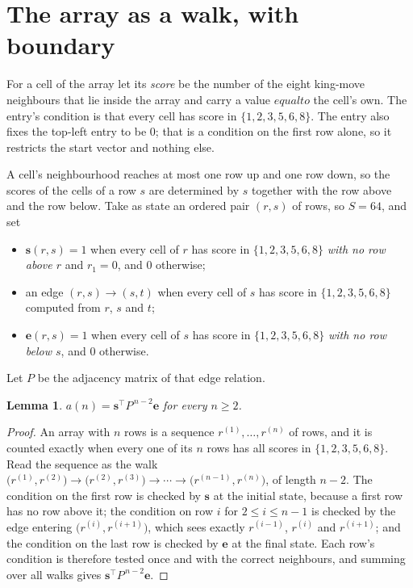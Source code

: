 \documentclass[11pt,a4paper]{article}
\theoremstyle{plain}
\newtheorem{lemma}[theorem]{Lemma}
\theoremstyle{definition}
\begin{document}
\section{The array as a walk, with boundary}

For a cell of the array let its \emph{score} be the number of the eight king-move neighbours that lie inside
the array and carry a value $equal to$ the cell's own. The entry's condition is that every cell
has score in $\{1,2,3,5,6,8\}$. The entry also fixes the top-left entry to be $0$; that is a condition on the first row alone, so it restricts the start vector and nothing else.

A cell's neighbourhood reaches at most one row up and one row down, so the scores of the
cells of a row $s$ are determined by $s$ together with the row above and the row below.
Take as state an ordered pair $(r,s)$ of rows, so $S=64$, and set
\begin{itemize}
\item $\mathbf{s}(r,s)=1$ when every cell of $r$ has score in $\{1,2,3,5,6,8\}$ \emph{with no row
above $r$} and $r_1=0$, and $0$ otherwise;
\item an edge $(r,s)\to(s,t)$ when every cell of $s$ has score in $\{1,2,3,5,6,8\}$ computed from
$r$, $s$ and $t$;
\item $\mathbf{e}(r,s)=1$ when every cell of $s$ has score in $\{1,2,3,5,6,8\}$ \emph{with no row
below $s$}, and $0$ otherwise.
\end{itemize}
Let $P$ be the adjacency matrix of that edge relation.

\begin{lemma}\label{lem:walk}
$a(n)=\mathbf{s}^{\!\top}P^{\,n-2}\mathbf{e}$ for every $n\ge2$.
\end{lemma}

\begin{proof}
An array with $n$ rows is a sequence $r^{(1)},\dots,r^{(n)}$ of rows, and it is counted
exactly when every one of its $n$ rows has all scores in $\{1,2,3,5,6,8\}$. Read the sequence as the
walk $\bigl(r^{(1)},r^{(2)}\bigr)\to\bigl(r^{(2)},r^{(3)}\bigr)\to\cdots\to
\bigl(r^{(n-1)},r^{(n)}\bigr)$, of length $n-2$. The condition on the first row is
checked by $\mathbf{s}$ at the initial state, because a first row has no row above it; the
condition on row $i$ for $2\le i\le n-1$ is checked by the edge entering
$\bigl(r^{(i)},r^{(i+1)}\bigr)$, which sees exactly $r^{(i-1)}$, $r^{(i)}$ and
$r^{(i+1)}$; and the condition on the last row is checked by $\mathbf{e}$ at the final
state. Each row's condition is therefore tested once and with the correct neighbours, and
summing over all walks gives $\mathbf{s}^{\!\top}P^{\,n-2}\mathbf{e}$.
\end{proof}
\end{document}
